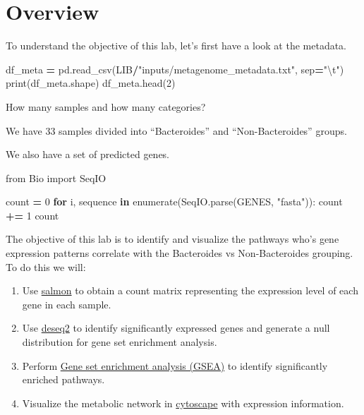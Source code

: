 \documentclass[
]{book}
\newenvironment{Shaded}{\begin{snugshade}}{\end{snugshade}}
\newcommand{\BuiltInTok}[1]{#1}
\newcommand{\CharTok}[1]{\textcolor[rgb]{0.31,0.60,0.02}{#1}}
\newcommand{\ControlFlowTok}[1]{\textcolor[rgb]{0.13,0.29,0.53}{\textbf{#1}}}
\newcommand{\DecValTok}[1]{\textcolor[rgb]{0.00,0.00,0.81}{#1}}
\newcommand{\ImportTok}[1]{#1}
\newcommand{\KeywordTok}[1]{\textcolor[rgb]{0.13,0.29,0.53}{\textbf{#1}}}
\newcommand{\NormalTok}[1]{#1}
\newcommand{\OperatorTok}[1]{\textcolor[rgb]{0.81,0.36,0.00}{\textbf{#1}}}
\newcommand{\StringTok}[1]{\textcolor[rgb]{0.31,0.60,0.02}{#1}}
\providecommand{\tightlist}{%
  \setlength{\itemsep}{0pt}\setlength{\parskip}{0pt}}
\begin{document}
\section{Overview}\label{overview-2}

To understand the objective of this lab, let's first have a look at the metadata.

\begin{Shaded}
\begin{Highlighting}[numbers=left,,]
\NormalTok{df\_meta }\OperatorTok{=}\NormalTok{ pd.read\_csv(LIB}\OperatorTok{/}\StringTok{"inputs/metagenome\_metadata.txt"}\NormalTok{, sep}\OperatorTok{=}\StringTok{"}\CharTok{\textbackslash{}t}\StringTok{"}\NormalTok{)}
\BuiltInTok{print}\NormalTok{(df\_meta.shape)}
\NormalTok{df\_meta.head(}\DecValTok{2}\NormalTok{)}
\end{Highlighting}
\end{Shaded}

How many samples and how many categories?

We have 33 samples divided into ``Bacteroides'' and ``Non-Bacteroides'' groups.

We also have a set of predicted genes.

\begin{Shaded}
\begin{Highlighting}[numbers=left,,]
\ImportTok{from}\NormalTok{ Bio }\ImportTok{import}\NormalTok{ SeqIO}

\NormalTok{count }\OperatorTok{=} \DecValTok{0}
\ControlFlowTok{for}\NormalTok{ i, sequence }\KeywordTok{in} \BuiltInTok{enumerate}\NormalTok{(SeqIO.parse(GENES, }\StringTok{"fasta"}\NormalTok{)):}
\NormalTok{    count }\OperatorTok{+=} \DecValTok{1}
\NormalTok{count}
\end{Highlighting}
\end{Shaded}

The objective of this lab is to identify and visualize the pathways who's gene expression patterns correlate with the Bacteroides vs Non-Bacteroides grouping.
To do this we will:

\begin{enumerate}
\def\labelenumi{\arabic{enumi}.}
\tightlist
\item
  Use \href{Salmon}{salmon} to obtain a count matrix representing the expression level of each gene in each sample.
\item
  Use \href{DESeq2}{deseq2} to identify significantly expressed genes and generate a null distribution for gene set enrichment analysis.
\item
  Perform \href{gene-set-enrichment-analysis-gsea}{Gene set enrichment analysis (GSEA)} to identify significantly enriched pathways.
\item
  Visualize the metabolic network in \href{Cytoscape}{cytoscape} with expression information.
\end{enumerate}
\end{document}
